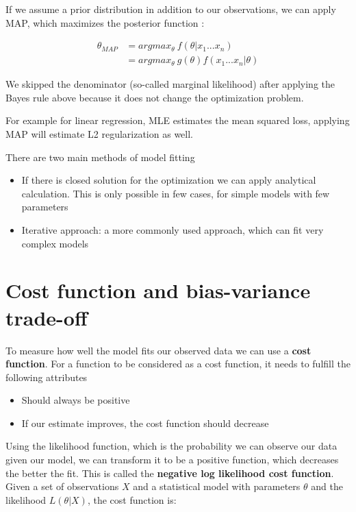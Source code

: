 If we assume a prior distribution in addition to our observations, we can apply MAP, which maximizes the posterior function :

\[
\begin{aligned}
\theta_{MAP} &= argmax_{\theta}\ f(\theta|x_1...x_n) \\
&= argmax_{\theta}\ g(\theta) f(x_1...x_n|\theta)
\end{aligned}
\]

We skipped the denominator (so-called marginal likelihood) after applying the Bayes rule above because it does not change the optimization problem.

For example for linear regression, MLE estimates the mean squared loss, applying MAP will estimate L2 regularization as well.

There are two main methods of model fitting
\begin{itemize}
    \item If there is closed solution for the optimization we can apply analytical calculation. This is only possible in few cases, for simple models with few parameters
    \item Iterative approach: a more commonly used approach, which can fit very complex models
\end{itemize}

\section{Cost function and bias-variance trade-off}

To measure how well the model fits our observed data we can use a \textbf{cost function}. For a function to be considered as a cost function, it needs to fulfill the following attributes

\begin{itemize}
    \item Should always be positive
    \item If our estimate improves, the cost function should decrease
\end{itemize}

Using the likelihood function, which is the probability we can observe our data given our model, we can transform it to be a positive function, which decreases the better the fit. This is called the \textbf{negative log likelihood cost function}. Given a set of observations \(X\) and a statistical model with parameters \(\theta\) and the likelihood \(L(\theta | X)\), the cost function is:


